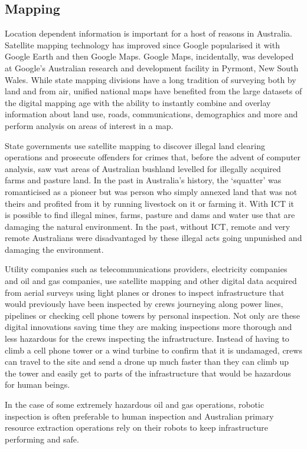 \subsection{Mapping}
Location dependent information is important for a host of reasons in Australia. Satellite mapping technology has improved since Google popularised it with Google Earth and then Google Maps. Google Maps, incidentally, was developed at Google's Australian research and development facility in Pyrmont, New South Wales. %
While state mapping divisions have a long tradition of surveying both by land and from air, unified national maps have benefited from the large datasets of the digital mapping age with the ability to instantly combine and overlay information about land use, roads, communications, demographics and more and perform analysis on areas of interest in a map. 

State governments use satellite mapping to discover illegal land clearing operations and prosecute offenders for crimes that, before the advent of computer analysis, saw vast areas of Australian bushland levelled for illegally acquired farms and pasture land. In the past in Australia's history, the `squatter' was romanticised as a pioneer but was person who simply annexed land that was not theirs and profited from it by running livestock on it or farming it. With ICT it is possible to find illegal mines, farms, pasture and dams and water use that are damaging the natural environment. In the past, without ICT, remote and very remote Australians were disadvantaged by these illegal acts going unpunished and damaging the environment. 

Utility companies such as telecommunications providers, electricity companies  and oil and gas companies, use satellite mapping and other digital data acquired from aerial surveys using light planes or drones to inspect infrastructure that would previously have been inspected by crews journeying along power lines, pipelines or checking cell phone towers by personal inspection. Not only are these digital innovations saving time they are making inspections more thorough and less hazardous for the crews inspecting the infrastructure. Instead of having to climb a cell phone tower or a wind turbine to confirm that it is undamaged, crews can travel to the site and send a drone up much faster than they can climb up the tower and easily get to parts of the infrastructure that would be hazardous for human beings.

In the case of some extremely hazardous oil and gas operations, robotic inspection is often preferable to human inspection and Australian primary resource extraction operations rely on their robots to keep infrastructure performing and safe. %


